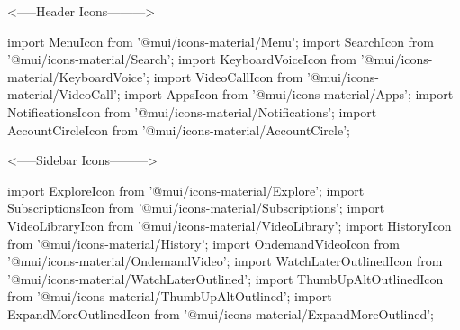 <-----Header Icons--------->

import MenuIcon from '@mui/icons-material/Menu';
import SearchIcon from '@mui/icons-material/Search';
import KeyboardVoiceIcon from '@mui/icons-material/KeyboardVoice';
import VideoCallIcon from '@mui/icons-material/VideoCall';
import AppsIcon from '@mui/icons-material/Apps';
import NotificationsIcon from '@mui/icons-material/Notifications';
import AccountCircleIcon from '@mui/icons-material/AccountCircle';

<-----Sidebar Icons--------->

import ExploreIcon from '@mui/icons-material/Explore';
import SubscriptionsIcon from '@mui/icons-material/Subscriptions';
import VideoLibraryIcon from '@mui/icons-material/VideoLibrary';
import HistoryIcon from '@mui/icons-material/History';
import OndemandVideoIcon from '@mui/icons-material/OndemandVideo';
import WatchLaterOutlinedIcon from '@mui/icons-material/WatchLaterOutlined';
import ThumbUpAltOutlinedIcon from '@mui/icons-material/ThumbUpAltOutlined';
import ExpandMoreOutlinedIcon from '@mui/icons-material/ExpandMoreOutlined';